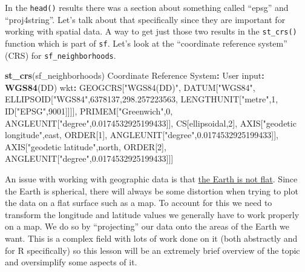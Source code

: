 \documentclass[
  12pt,
]{book}
\newenvironment{Shaded}{\begin{snugshade}}{\end{snugshade}}
\newcommand{\DecValTok}[1]{\textcolor[rgb]{0.06,0.06,0.06}{#1}}
\newcommand{\FloatTok}[1]{\textcolor[rgb]{0.06,0.06,0.06}{#1}}
\newcommand{\KeywordTok}[1]{\textcolor[rgb]{0.27,0.27,0.27}{\textbf{#1}}}
\newcommand{\NormalTok}[1]{#1}
\newcommand{\OperatorTok}[1]{\textcolor[rgb]{0.43,0.43,0.43}{\textbf{#1}}}
\newcommand{\StringTok}[1]{\textcolor[rgb]{0.5,0.5,0.5}{#1}}
\begin{document}
In the \texttt{head()} results there was a section about something called ``epsg'' and ``proj4string''. Let's talk about that specifically since they are important for working with spatial data. A way to get just those two results in the \texttt{st\_crs()} function which is part of \texttt{sf}. Let's look at the ``coordinate reference system'' (CRS) for \texttt{sf\_neighborhoods}.

\begin{Shaded}
\begin{Highlighting}[]
\KeywordTok{st\_crs}\NormalTok{(sf\_neighborhoods)}
\NormalTok{Coordinate Reference System}\OperatorTok{:}
\StringTok{  }\NormalTok{User input}\OperatorTok{:}\StringTok{ }\KeywordTok{WGS84}\NormalTok{(DD) }
\NormalTok{  wkt}\OperatorTok{:}
\NormalTok{GEOGCRS[}\StringTok{"WGS84(DD)"}\NormalTok{,}
\NormalTok{    DATUM[}\StringTok{"WGS84"}\NormalTok{,}
\NormalTok{        ELLIPSOID[}\StringTok{"WGS84"}\NormalTok{,}\DecValTok{6378137}\NormalTok{,}\FloatTok{298.257223563}\NormalTok{,}
\NormalTok{            LENGTHUNIT[}\StringTok{"metre"}\NormalTok{,}\DecValTok{1}\NormalTok{,}
\NormalTok{                ID[}\StringTok{"EPSG"}\NormalTok{,}\DecValTok{9001}\NormalTok{]]]],}
\NormalTok{    PRIMEM[}\StringTok{"Greenwich"}\NormalTok{,}\DecValTok{0}\NormalTok{,}
\NormalTok{        ANGLEUNIT[}\StringTok{"degree"}\NormalTok{,}\FloatTok{0.0174532925199433}\NormalTok{]],}
\NormalTok{    CS[ellipsoidal,}\DecValTok{2}\NormalTok{],}
\NormalTok{        AXIS[}\StringTok{"geodetic longitude"}\NormalTok{,east,}
\NormalTok{            ORDER[}\DecValTok{1}\NormalTok{],}
\NormalTok{            ANGLEUNIT[}\StringTok{"degree"}\NormalTok{,}\FloatTok{0.0174532925199433}\NormalTok{]],}
\NormalTok{        AXIS[}\StringTok{"geodetic latitude"}\NormalTok{,north,}
\NormalTok{            ORDER[}\DecValTok{2}\NormalTok{],}
\NormalTok{            ANGLEUNIT[}\StringTok{"degree"}\NormalTok{,}\FloatTok{0.0174532925199433}\NormalTok{]]]}
\end{Highlighting}
\end{Shaded}

An issue with working with geographic data is that \href{https://en.wikipedia.org/wiki/Spherical_Earth}{the Earth is not flat}. Since the Earth is spherical, there will always be some distortion when trying to plot the data on a flat surface such as a map. To account for this we need to transform the longitude and latitude values we generally have to work properly on a map. We do so by ``projecting'' our data onto the areas of the Earth we want. This is a complex field with lots of work done on it (both abstractly and for R specifically) so this lesson will be an extremely brief overview of the topic and oversimplify some aspects of it.
\end{document}
